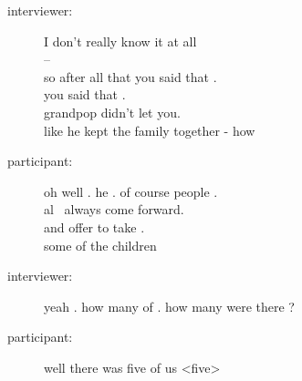 \documentclass{article}
\newcommand{\turn}[2]{
\item[#1:] #2
}
\begin{document}
\begin{description}
\turn{interviewer}{I don't really know it at all\\
 -- \\
so after all that you said that .\\
you said that .\\
grandpop didn't let you.\\
like he kept the family together - how}

\turn{participant}{oh well . he . of course people .\\
al~ always come forward.\\
and offer to take .\\
some of the children}

\turn{interviewer}{yeah . how many of . how many were there ?}

\turn{participant}{ well there was five of us <five>}


\end{description}
\end{document}
